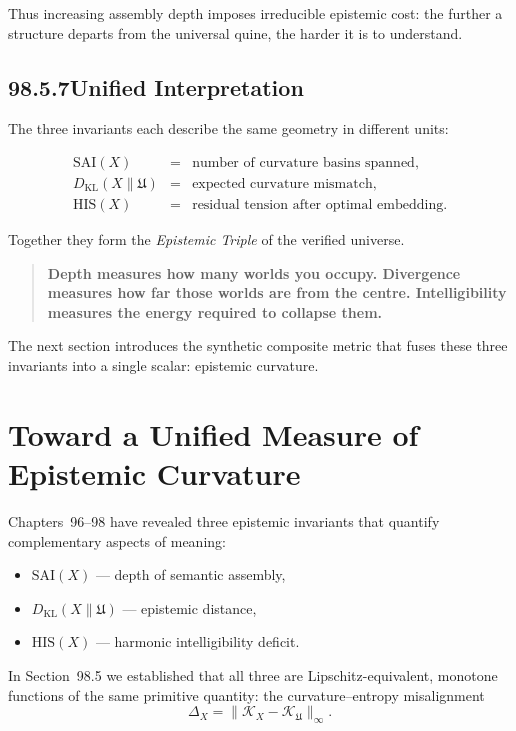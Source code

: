 Thus increasing assembly depth imposes irreducible epistemic cost:
the further a structure departs from the universal quine,  
the harder it is to understand.

\subsection*{98.5.7\quad Unified Interpretation}

The three invariants each describe the same geometry in different units:

\[
\begin{array}{rcl}
\mathrm{SAI}(X) 
 & = & \text{number of curvature basins spanned}, \\[4pt]
D_{\mathrm{KL}}(X\|\mathfrak{U})
 & = & \text{expected curvature mismatch}, \\[4pt]
\mathrm{HIS}(X)
 & = & \text{residual tension after optimal embedding}.
\end{array}
\]

Together they form the \emph{Epistemic Triple} of the verified universe.

\begin{quote}
\textbf{Depth measures how many worlds you occupy.  
Divergence measures how far those worlds are from the centre.  
Intelligibility measures the energy required to collapse them.}
\end{quote}

The next section introduces the synthetic composite metric that fuses these
three invariants into a single scalar: epistemic curvature.

\section{Toward a Unified Measure of Epistemic Curvature}

Chapters~96–98 have revealed three epistemic invariants that quantify
complementary aspects of meaning:

\begin{itemize}
\item $\mathrm{SAI}(X)$ — depth of semantic assembly,
\item $D_{\mathrm{KL}}(X\|\mathfrak{U})$ — epistemic distance,
\item $\mathrm{HIS}(X)$ — harmonic intelligibility deficit.
\end{itemize}

In Section~98.5 we established that all three are Lipschitz-equivalent,
monotone functions of the same primitive quantity:
the curvature–entropy misalignment
\[
\Delta_X = \|\mathcal{K}_X - \mathcal{K}_{\mathfrak{U}}\|_\infty.
\]

